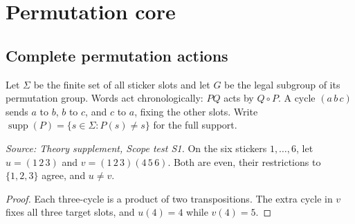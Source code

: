 \chapter{Permutation core}
\label{ch:ArchonFull600Theory_Basic}

\section{Complete permutation actions}

Let \(\Sigma\) be the finite set of all sticker slots and let \(G\) be
the legal subgroup of its permutation group. Words act chronologically:
\(P Q\) acts by \(Q\circ P\). A cycle \((a\,b\,c)\) sends \(a\) to \(b\),
\(b\) to \(c\), and \(c\) to \(a\), fixing the other slots. Write
\(\operatorname{supp}(P)=\{s\in\Sigma:P(s)\ne s\}\) for the full support.

\begin{lemma}
  \label{lem:scope-same-restriction}
  \leanok
  \textit{Source: Theory supplement, Scope test S1.}
  On the six stickers \(1,\ldots,6\), let \(u=(1\,2\,3)\) and
  \(v=(1\,2\,3)(4\,5\,6)\). Both are even, their restrictions to
  \(\{1,2,3\}\) agree, and \(u\ne v\).
\end{lemma}
\begin{proof}
  \leanok
  Each three-cycle is a product of two transpositions. The extra cycle
  in \(v\) fixes all three target slots, and \(u(4)=4\) while \(v(4)=5\).
\end{proof}

